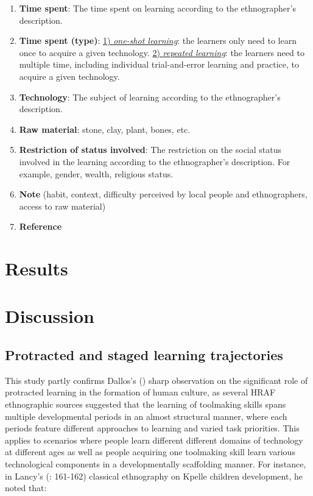 \documentclass[
  11pt,
]{article}
\begin{document}
\begin{enumerate}
\item
  \textbf{Time spent}: The time spent on learning according to the ethnographer's description.
\item
  \textbf{Time spent (type)}: \ul{1) \emph{one-shot learning}}: the learners only need to learn once to acquire a given technology. \ul{2) \emph{repeated learning}}: the learners need to multiple time, including individual trial-and-error learning and practice, to acquire a given technology.
\item
  \textbf{Technology}: The subject of learning according to the ethnographer's description.
\item
  \textbf{Raw material}: stone, clay, plant, bones, etc.
\item
  \textbf{Restriction of status involved}: The restriction on the social status involved in the learning according to the ethnographer's description. For example, gender, wealth, religious status.
\item
  \textbf{Note} (habit, context, difficulty perceived by local people and ethnographers, access to raw material)
\item
  \textbf{Reference}
\end{enumerate}

\section{Results}\label{results}

\section{Discussion}\label{discussion}

\subsection{Protracted and staged learning trajectories}\label{protracted-and-staged-learning-trajectories}

This study partly confirms Dallos's () sharp observation on the significant role of protracted learning in the formation of human culture, as several HRAF ethnographic sources suggested that the learning of toolmaking skills spans multiple developmental periods in an almost structural manner, where each periods feature different approaches to learning and varied task priorities. This applies to scenarios where people learn different different domains of technology at different ages as well as people acquiring one toolmaking skill learn various technological components in a developmentally scaffolding manner. For instance, in Lancy's (: 161-162) classical ethnography on Kpelle children development, he noted that:
\end{document}
